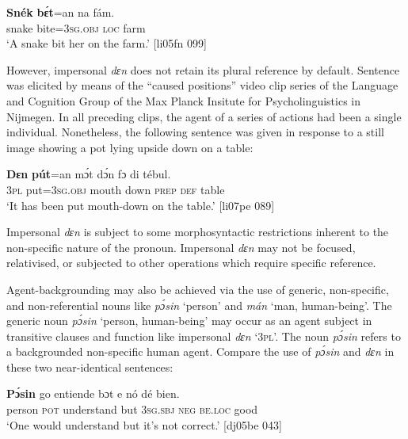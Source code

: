 \ea%
    \label{ex:key:1346}
    \gll \textbf{Snék}  \textbf{bɛ́t}=an    na  fám.\\
snake  bite=\textsc{3sg.obj}  \textsc{loc}  farm\\

\glt ‘A snake bit her on the farm.’ [li05fn 099]
\z

However, impersonal \textit{dɛn} does not retain its plural reference by default. Sentence  was elicited by means of the “caused positions” video clip series of the Language and Cognition Group of the Max Planck Insitute for Psycholinguistics in Nijmegen. In all preceding clips, the agent of a series of actions had been a single individual. Nonetheless, the following sentence was given in response to a still image showing a pot lying upside down on a table: 


\ea%
    \label{ex:key:1347}
    \gll \textbf{Dɛn}  \textbf{pút}=an    mɔ́t    dɔ́n    fɔ  di  tébul.\\
\textsc{3pl}  put=\textsc{3sg.obj}  mouth  down  \textsc{prep}  \textsc{def}  table\\

\glt ‘It has been put mouth-down on the table.’ [li07pe 089]
\z

Impersonal \textit{dɛn} is subject to some morphosyntactic restrictions inherent to the non-specific nature of the pronoun. Impersonal \textit{dɛn} may not be focused, relativised, or subjected to other operations which require specific reference. 


Agent-backgrounding may also be achieved via the use of generic, non-specific, and non-referential nouns like \textit{pɔ́sin} ‘person’ and \textit{mán} ‘man, human-being’. The generic noun \textit{pɔ́sin} ‘person, human-being’ may occur as an agent subject in transitive clauses and function like impersonal \textit{dɛn} ‘\textsc{3pl}’. The noun \textit{pɔ́sin} refers to a backgrounded non-specific human agent. Compare the use of \textit{pɔ́sin} and \textit{dɛn} in these two near-identical sentences:



\ea%
    \label{ex:key:1348}
    \gll \textbf{Pɔ́sin}  go  entiende    bɔt  e    nó  dé    bien.\\
person  \textsc{pot}  understand  but  \textsc{3sg.sbj}  \textsc{neg}  \textsc{be.loc}  good\\

\glt ‘One would understand but it’s not correct.’ [dj05be 043]
\z


